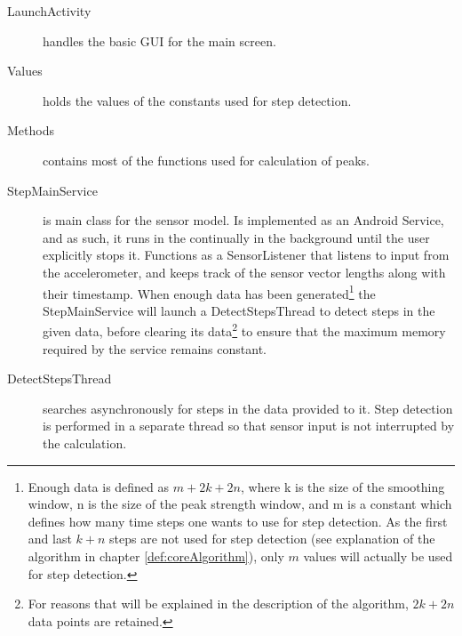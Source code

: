 \begin{description}

\item[LaunchActivity]
handles the basic GUI for the main screen.

\item[Values]
holds the values of the constants used for step detection.

\item[Methods]
contains most of the functions used for calculation of peaks.

\item[StepMainService]
is main class for the sensor model. Is implemented as an Android Service, and as such, it runs in the continually in the background until the user explicitly stops it. Functions as a SensorListener that listens to input from the accelerometer, and keeps track of the sensor vector lengths along with their timestamp. When enough data has been generated\footnote{Enough data is defined as $m+2k+2n$, where k is the size of the smoothing window, n is the size of the peak strength window, and m is a constant which defines how many time steps one wants to use for step detection. As the first and last $k+n$ steps are not used for step detection (see explanation of the algorithm in chapter \ref{def:coreAlgorithm}), only $m$ values will actually be used for step detection.} the StepMainService will launch a DetectStepsThread to detect steps in the given data, before clearing its data\footnote{For reasons that will be explained in the description of the algorithm, $2k+2n$ data points are retained.} to ensure that the maximum memory required by the service remains constant. 

\item[DetectStepsThread]
searches asynchronously for steps in the data provided to it. Step detection is performed in a separate thread so that sensor input is not interrupted by the calculation.


\end{description}
